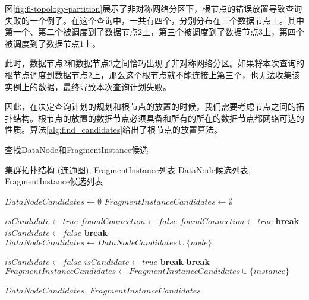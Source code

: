 图\ref{fig:fi-topology-partition}展示了非对称网络分区下，根节点的错误放置导致查询失败的一个例子。在这个查询中，一共有四个\fragmentinstance ，分别分布在三个数据节点上。其中第一个、第二个\fragmentinstance 被调度到了数据节点2上，第三个\fragmentinstance 被调度到了数据节点3上，第四个\fragmentinstance 被调度到了数据节点1上。

此时，数据节点2和数据节点3之间恰巧出现了非对称网络分区。如果将本次查询的根节点\fragmentinstance 调度到数据节点2上，那么这个根节点\fragmentinstance 就不能连接上第三个\fragmentinstance ，也无法收集该实例上的数据，最终导致本次查询计划失败。

因此，在决定查询计划的规划和根节点\fragmentinstance 的放置的时候，我们需要考虑节点之间的拓扑结构。根节点的\fragmentinstance 放置的数据节点必须具备和所有的\fragmentinstance 所在的数据节点都网络可达的性质。算法\ref{alg:find_candidates}给出了根节点\fragmentinstance 的放置算法。

\begin{algorithm}
  \caption{查找DataNode和FragmentInstance候选}
  \label{alg:find_candidates}
  \begin{algorithmic}
  \REQUIRE 集群拓扑结构 (连通图), FragmentInstance列表
  \ENSURE DataNode候选列表, FragmentInstance候选列表
  
  \STATE $DataNodeCandidates \leftarrow \emptyset$
  \STATE $FragmentInstanceCandidates \leftarrow \emptyset$
  
      \STATE $isCandidate \leftarrow true$
          \STATE $foundConnection \leftarrow false$
                  \STATE $foundConnection \leftarrow true$
                  \STATE \textbf{break} 
              \ENDIF
          \ENDFOR
              \STATE $isCandidate \leftarrow false$
              \STATE \textbf{break} 
          \ENDIF
      \ENDFOR
          \STATE $DataNodeCandidates \leftarrow DataNodeCandidates \cup \{node\}$
      \ENDIF
  \ENDFOR
  
      \STATE $isCandidate \leftarrow false$
                  \STATE $isCandidate \leftarrow true$
                  \STATE \textbf{break} 
              \ENDIF
          \ENDFOR
              \STATE \textbf{break} 
          \ENDIF
      \ENDFOR
          \STATE $FragmentInstanceCandidates \leftarrow FragmentInstanceCandidates \cup \{instance\}$
      \ENDIF
  \ENDFOR
  
  \RETURN $DataNodeCandidates$, $FragmentInstanceCandidates$
  \end{algorithmic}
  \end{algorithm}

